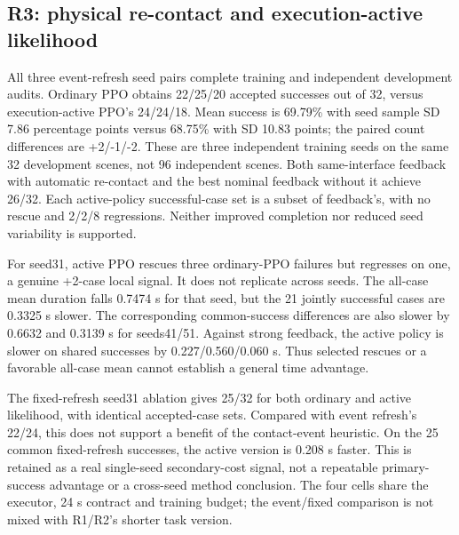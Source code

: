 
\subsection{R3: physical re-contact and execution-active likelihood}
All three event-refresh seed pairs complete training and independent development audits. Ordinary PPO obtains 22/25/20 accepted successes out of 32, versus execution-active PPO's 24/24/18. Mean success is 69.79\% with seed sample SD 7.86 percentage points versus 68.75\% with SD 10.83 points; the paired count differences are +2/-1/-2. These are three independent training seeds on the same 32 development scenes, not 96 independent scenes. Both same-interface feedback with automatic re-contact and the best nominal feedback without it achieve 26/32. Each active-policy successful-case set is a subset of feedback's, with no rescue and 2/2/8 regressions. Neither improved completion nor reduced seed variability is supported.

For seed31, active PPO rescues three ordinary-PPO failures but regresses on one, a genuine +2-case local signal. It does not replicate across seeds. The all-case mean duration falls 0.7474 s for that seed, but the 21 jointly successful cases are 0.3325 s slower. The corresponding common-success differences are also slower by 0.6632 and 0.3139 s for seeds41/51. Against strong feedback, the active policy is slower on shared successes by 0.227/0.560/0.060 s. Thus selected rescues or a favorable all-case mean cannot establish a general time advantage.

The fixed-refresh seed31 ablation gives 25/32 for both ordinary and active likelihood, with identical accepted-case sets. Compared with event refresh's 22/24, this does not support a benefit of the contact-event heuristic. On the 25 common fixed-refresh successes, the active version is 0.208 s faster. This is retained as a real single-seed secondary-cost signal, not a repeatable primary-success advantage or a cross-seed method conclusion. The four cells share the executor, 24 s contract and training budget; the event/fixed comparison is not mixed with R1/R2's shorter task version.


